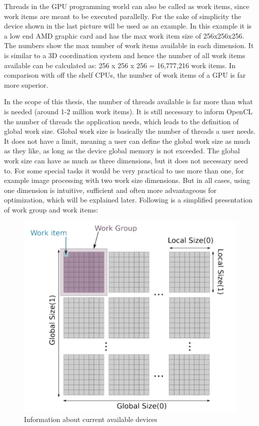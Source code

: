Threads in the GPU programming world can also be called as work items, since work items are meant to be executed parallelly. For the sake of simplicity the device shown in the last picture will be used as an example. In this example it is a low end AMD graphic card and has the max work item size of 256x256x256. The numbers show the max number of work items available in each dimension. It is similar to a 3D coordination system and hence the number of all work items available can be calculated as: 256 x 256 x 256 = 16,777,216 work items. In comparison with off the shelf CPUs, the number of work items of a GPU is far more superior.

In the scope of this thesis, the number of threads available is far more than what is needed (around 1-2 million work items). It is still necessary to inform OpenCL the number of threads the application needs, which leads to the definition of global work size. Global work size is basically  the number of threads a user needs. It does not have a limit, meaning a user can define the global work size as much as they like, as long as the device global memory is not exceeded. The global work size can have as much as three dimensions, but it does not necessary need to. For some special tasks it would be very practical to use more than one, for example image processing with two work size dimensions. But in all cases, using one dimension is intuitive, sufficient and often more advantageous for optimization, which will be explained later. Following is a simplified presentation of work group and work items:

\begin{figure}[H]
	\centering
	\includegraphics[width=10 cm]{images/itemunit.png}
	\caption{Information about current available devices}
	\label{ExampleOCTImage}
\end{figure}

